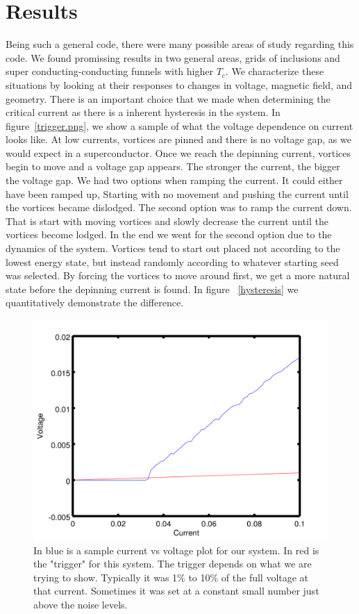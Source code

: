 \section{Results}
Being such a general code, there were many possible areas of study regarding this code. We found promissing results in two general areas, grids of inclusions and super conducting-conducting funnels with higher $T_c$. We characterize these situations by looking at their responses to changes in voltage, magnetic field, and geometry. There is an important choice that we made when determining the critical current as there is a inherent hysteresis in the system. In figure~\ref{trigger.png}, we show a sample of what the voltage dependence on current looks like. At low currents, vortices are pinned and there is no voltage gap, as we would expect in a superconductor. Once we reach the depinning current, vortices begin to move and a voltage gap appears. The stronger the current, the bigger the voltage gap. We had two options when ramping the current. It could either have been ramped up, Starting with no movement and pushing the current until the vortices became dislodged. The second option was to ramp the current down. That is start with moving vortices and slowly decrease the current until the vortices become lodged. In the end we went for the second option due to the dynamics of the system. Vortices tend to start out placed not according to the lowest energy state, but instead randomly according to whatever starting seed was selected. By forcing the vortices to move around first, we get a more natural state before the depinning current is found. In figure ~\ref{hysteresis} we quantitatively demonstrate the difference.

\begin{figure}[htbp]
\begin{center}
\includegraphics[scale=.50]{trigger.png}
\caption{ In blue is a sample current vs voltage plot for our system. In red is the "trigger" for this system. The trigger depends on what we are trying to show. Typically it was 1\% to 10\% of the full voltage at that current. Sometimes it was set at a constant small number just above the noise levels.}
\label{trigger}
\end{center}
\end{figure}


